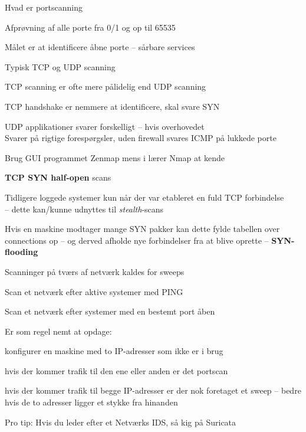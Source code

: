 \documentclass[20pt,landscape,a4paper,footrule]{foils}
\begin{document}

\begin{list1}
\item Hvad er portscanning
\item Afprøvning af alle porte fra 0/1 og op til 65535
\item Målet er at identificere åbne porte -- sårbare services
\item Typisk TCP og UDP scanning
\item TCP scanning er ofte mere pålidelig end UDP scanning
\item TCP handshake er nemmere at identificere, skal svare SYN
\item UDP applikationer svarer forskelligt -- hvis overhovedet\\
Svarer på rigtige forespørgsler, uden firewall svares ICMP på lukkede porte
\item Brug GUI programmet Zenmap mens i lærer Nmap at kende
\end{list1}




\begin{list2}
\item {\bfseries TCP SYN half-open} scans
\item Tidligere loggede systemer kun når der var etableret en fuld TCP
  forbindelse\\
  -- dette kan/kunne udnyttes til \emph{stealth}-scans
\item Hvis en maskine modtager mange SYN pakker kan dette fylde
  tabellen over connections op -- og derved afholde nye forbindelser
  fra at blive oprette -- {\bfseries SYN-flooding}
\end{list2}



\begin{list1}
\item Scanninger på tværs af netværk kaldes for sweeps
\item Scan et netværk efter aktive systemer med PING
\item Scan et netværk efter systemer med en bestemt port åben
\item Er som regel nemt at opdage:
  \begin{list2}
    \item konfigurer en maskine med to IP-adresser som ikke er i brug
\item hvis der kommer trafik til den ene eller anden er det portscan
\item hvis der kommer trafik til begge IP-adresser er der nok
  foretaget et sweep -- bedre hvis de to adresser ligger et stykke fra hinanden
  \end{list2}

\vskip 2cm
Pro tip: Hvis du leder efter et Netværks IDS, så kig på Suricata 
\end{list1}
\end{document}

